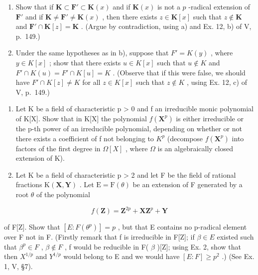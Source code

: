 \begin{enumerate}
\def\labelenumi{\alph{enumi})}
\setcounter{enumi}{1}
\item
  Show that if \(\mathbf{K} \subset \mathbf{F}' \subset \mathbf{K}(x)\) and if \(\mathbf{K}(x)\) is not a \(p\) -radical extension of \(\mathbf{F}'\) and if \(\mathbf{K} \neq \mathbf{F}' \neq \mathbf{K}(x)\) , then there exists \(z \in \mathbf{K}[x]\) such that \(z \notin \mathbf{K}\) and \(\mathbf{F}' \cap \mathbf{K}[z] = \mathbf{K}\) . (Argue by contradiction, using a) and Ex. 12, b) of V, p.~149.)
\item
  Under the same hypotheses as in b), suppose that \(F' = K(y)\) , where \(y \in K[x]\) ; show that there exists \(u \in K[x]\) such that \(u \notin K\) and \(F' \cap K(u) = F' \cap K[u] = K\) . (Observe that if this were false, we should have \(F' \cap K[z] \neq K\) for all \(z \in K[x]\) such that \(z \notin K\) , using Ex. 12, c) of V, p.~149.)
\end{enumerate}

\begin{enumerate}
\def\labelenumi{\arabic{enumi})}
\setcounter{enumi}{1}
\item
  Let K be a field of characteristic p \textgreater{} 0 and f an irreducible monic polynomial of K{[}X{]}. Show that in K{[}X{]} the polynomial \(f(\mathbf{X}^{p})\) is either irreducible or the p-th power of an irreducible polynomial, depending on whether or not there exists a coefficient of f not belonging to \(K^{p}\) (decompose \(f(\mathbf{X}^{p})\) into factors of the first degree in \(\Omega[X]\) , where \(\Omega\) is an algebraically closed extension of K).
\item
  Let K be a field of characteristic p \textgreater{} 2 and let F be the field of rational fractions \(\mathrm{K}(\mathbf{X}, \mathbf{Y})\) . Let \(\mathrm{E} = \mathrm{F}(\theta)\) be an extension of F generated by a root \(\theta\) of the polynomial
\end{enumerate}

\[
f (\mathbf {Z}) = \mathbf {Z} ^ {2 p} + \mathbf {X Z} ^ {p} + \mathbf {Y}
\]

of F{[}Z{]}. Show that \([E:F(\theta^{p})]=p\) , but that E contains no p-radical element over F not in F. (Firstly remark that f is irreducible in F{[}Z{]}; if \(\beta\in E\) existed such that \(\beta^{p}\in F\) , \(\beta\notin F\) , f would be reducible in F( \(\beta\) ){[}Z{]}; using Ex. 2, show that then \(X^{1/p}\) and \(Y^{1/p}\) would belong to E and we would have \([E:F]\geqslant p^{2}\) .) (See Ex. 1, V, §7).

